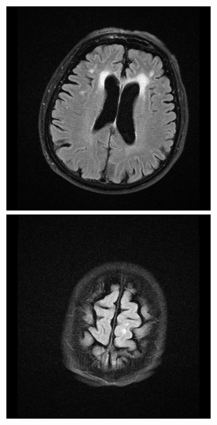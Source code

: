 \documentclass[conference]{IEEEtran}
\begin{document}
\includegraphics[scale = 0.2]{origin_14.png}
\includegraphics[scale = 0.2]{origin_21.png}
\end{document}

